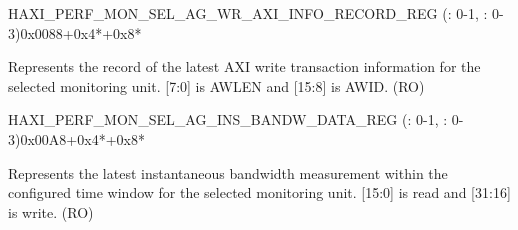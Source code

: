 \begin{register}{H}{AXI\_PERF\_MON\_SEL\_AG\_WR\_AXI\_INFO\_RECORD\_REG (: 0-1, : 0-3)}{0x0088+0x4*+0x8*}\label{regdesc:AXIPERFMONSELAGNWRAXIINFORECORDMREG}
%
%
\regnewline%
\begin{regdesc}\begin{reglist}
\label{fielddesc:AXIPERFMONSELAGNWRAXIINFORECORDM}\item [AXI\_PERF\_MON\_SEL\_AG\regindex{n}\_WR\_AXI\_INFO\_RECORD\regindex{m} (\regindex{n}: 0-1, \regindex{m}: 0-3)] Represents the record of the latest AXI write transaction information for the selected monitoring unit. [7:0] is AWLEN and [15:8] is AWID. (RO)
\end{reglist}\end{regdesc}
\end{register}


\begin{register}{H}{AXI\_PERF\_MON\_SEL\_AG\_INS\_BANDW\_DATA\_REG (: 0-1, : 0-3)}{0x00A8+0x4*+0x8*}\label{regdesc:AXIPERFMONSELAGNINSBANDWDATAMREG}
%
\regnewline%
\begin{regdesc}\begin{reglist}
\label{fielddesc:AXIPERFMONSELAGNINSBANDWDATAM}\item [AXI\_PERF\_MON\_SEL\_AG\regindex{n}\_INS\_BANDW\_DATA\regindex{m} (\regindex{n}: 0-1, \regindex{m}: 0-3)] Represents the latest instantaneous bandwidth measurement within the configured time window for the selected monitoring unit. [15:0] is read and [31:16] is write. (RO)
\end{reglist}\end{regdesc}
\end{register}


